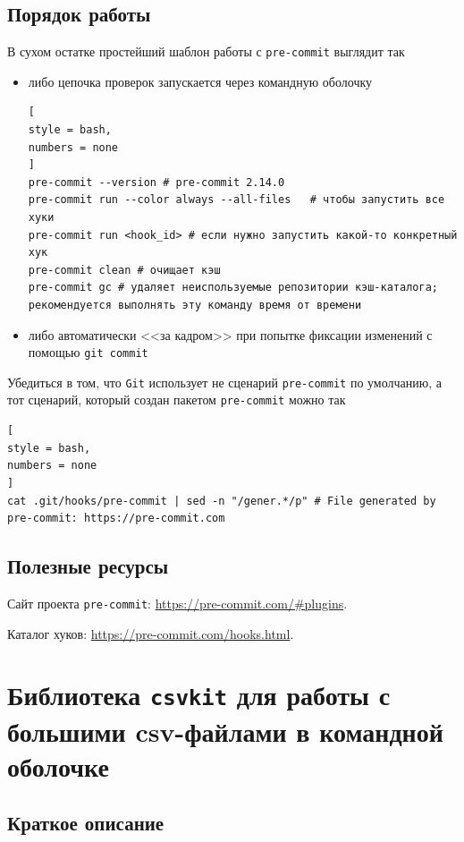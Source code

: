 \documentclass[%
	11pt,
	a4paper,
	utf8,
		]{article}
\begin{document}
\subsection{Порядок работы}

В сухом остатке простейший шаблон работы с \texttt{pre-commit} выглядит так
\begin{itemize}
	\item либо цепочка проверок запускается через командную оболочку
\begin{lstlisting}[
style = bash,
numbers = none
]
pre-commit --version # pre-commit 2.14.0
pre-commit run --color always --all-files	# чтобы запустить все хуки
pre-commit run <hook_id> # если нужно запустить какой-то конкретный хук
pre-commit clean # очищает кэш
pre-commit gc # удаляет неиспользуемые репозитории кэш-каталога; рекомендуется выполнять эту команду время от времени
\end{lstlisting}

    \item либо автоматически <<за кадром>> при попытке фиксации изменений с помощью \texttt{git commit}
\end{itemize}

Убедиться в том, что \texttt{Git} использует не сценарий \texttt{pre-commit} по умолчанию, а тот сценарий, который создан пакетом \texttt{pre-commit} можно так
\begin{lstlisting}[
style = bash,
numbers = none	
]
cat .git/hooks/pre-commit | sed -n "/gener.*/p" # File generated by pre-commit: https://pre-commit.com
\end{lstlisting}


\subsection{Полезные ресурсы}

Сайт проекта \texttt{pre-commit}: \url{https://pre-commit.com/#plugins}.

Каталог хуков: \url{https://pre-commit.com/hooks.html}.

\section{Библиотека \texttt{csvkit} для работы с большими csv-файлами в командной оболочке}

\subsection{Краткое описание}
\end{document}
